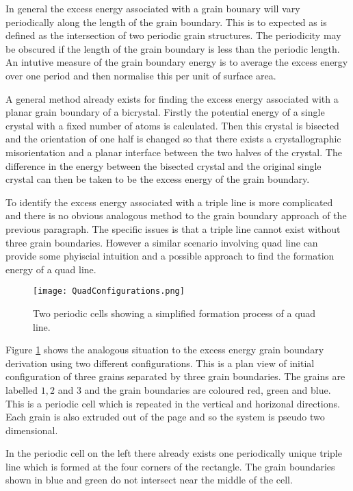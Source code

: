 \documentclass[12pt,a4paper]{book}
\begin{document}
In general the excess energy associated with a grain bounary will vary periodically along the length of the grain boundary. This is to expected as is defined as the intersection of two periodic grain structures. The periodicity may be obscured if the length of the grain boundary is less than the periodic length. An intutive measure of the grain boundary energy is to average the excess energy over one period and then normalise this per unit of surface area.

A general method already exists for finding the excess energy associated with a planar grain boundary of a bicrystal. Firstly the potential energy of a single crystal with a fixed number of atoms is calculated. Then this crystal is bisected and the orientation of one half is changed so that there exists a crystallographic misorientation and a planar interface between the two halves of the crystal. The difference in the energy between the bisected crystal and the original single crystal can then be taken to be the excess energy of the grain boundary.

To identify the excess energy associated with a triple line is more complicated and there is no obvious analogous method to the grain boundary approach of the previous paragraph. The specific issues is that a triple line cannot exist without three grain boundaries. However a similar scenario involving quad line can provide some phyiscial intuition and a possible approach to find the formation energy of a quad line. 

\begin{figure}[H]
	\centering
	\texttt{[image: QuadConfigurations.png]} 
\label{fig:1}
\caption{Two periodic cells showing a simplified formation process of a quad line.}
\end{figure}

Figure \ref{fig:1}
 shows the analogous situation to the excess energy grain boundary derivation using two different configurations. This is a plan view of initial configuration of three grains separated by three grain boundaries. The grains are labelled $1, 2$ and $3$ and the grain boundaries are coloured red, green and blue. This is a periodic cell which is repeated in the vertical and horizonal directions. Each grain is also extruded out of the page and so the system is pseudo two dimensional.
 
In the periodic cell on the left there already exists one periodically unique triple line which is formed at the four corners of the rectangle. The grain boundaries shown in blue and green do not intersect near the middle of the cell. 
\end{document}
